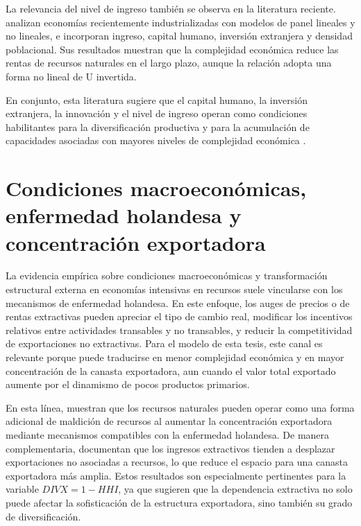 \documentclass[../../PTFM.tex]{subfiles}
\begin{document}
	La relevancia del nivel de ingreso también se observa en la literatura reciente. \textcite{Li2024} analizan economías recientemente industrializadas con modelos de panel lineales y no lineales, e incorporan ingreso, capital humano, inversión extranjera y densidad poblacional. Sus resultados muestran que la complejidad económica reduce las rentas de recursos naturales en el largo plazo, aunque la relación adopta una forma no lineal de U invertida.
	
	En conjunto, esta literatura sugiere que el capital humano, la inversión extranjera, la innovación y el nivel de ingreso operan como condiciones habilitantes para la diversificación productiva y para la acumulación de capacidades asociadas con mayores niveles de complejidad económica \parencite{YaseminYalta2021,Khan2020,Alvarado2023,Li2024}.

	\section{Condiciones macroeconómicas, enfermedad holandesa y concentración exportadora}
	\label{sec:condiciones-macroeconomicas-dutch-disease}
	
	La evidencia empírica sobre condiciones macroeconómicas y transformación estructural externa en economías intensivas en recursos suele vincularse con los mecanismos de enfermedad holandesa. En este enfoque, los auges de precios o de rentas extractivas pueden apreciar el tipo de cambio real, modificar los incentivos relativos entre actividades transables y no transables, y reducir la competitividad de exportaciones no extractivas. Para el modelo de esta tesis, este canal es relevante porque puede traducirse en menor complejidad económica y en mayor concentración de la canasta exportadora, aun cuando el valor total exportado aumente por el dinamismo de pocos productos primarios.

	En esta línea, \textcite{Bahar2018} muestran que los recursos naturales pueden operar como una forma adicional de maldición de recursos al aumentar la concentración exportadora mediante mecanismos compatibles con la enfermedad holandesa. De manera complementaria, \textcite{Harding2016} documentan que los ingresos extractivos tienden a desplazar exportaciones no asociadas a recursos, lo que reduce el espacio para una canasta exportadora más amplia. Estos resultados son especialmente pertinentes para la variable $DIVX=1-HHI$, ya que sugieren que la dependencia extractiva no solo puede afectar la sofisticación de la estructura exportadora, sino también su grado de diversificación.
\end{document}
